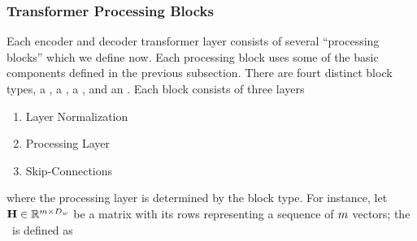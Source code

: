 \subsubsection{Transformer Processing Blocks}
Each encoder and decoder transformer layer consists of several
``processing blocks'' which we define now. Each processing block 
uses some of the basic components defined in the previous subsection.
%  
  There are fourt distinct block types, a \feedforwardblock, a \selfattentionblock, a \maskedselfattentionblock, and an \encoderattentionblock. 
  Each block consists of three layers
    \begin{enumerate}
        \item Layer Normalization
        \item Processing Layer
        \item Skip-Connections
    \end{enumerate}
    where the processing layer is determined by the block type. For instance,
    let $\mathbf{H} \in \mathbb{R}^{m \times D_{w}}$ be a
    matrix with its rows representing a sequence of $m$ vectors; the \feedforwardblock~is defined as \\

